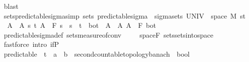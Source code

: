 \begin{isabellebody}
\ blast%
\endisatagproof
{\isafoldproof}%
%
\isadelimproof
%
\endisadelimproof
\isanewline
\isanewline
{}\isamarkupfalse%
\ sets{\isacharunderscore}{\kern0pt}predictable{\isacharunderscore}{\kern0pt}sigma{\isacharbrackleft}{\kern0pt}simp{\isacharbrackright}{\kern0pt}{\isacharcolon}{\kern0pt}\ {\isachardoublequoteopen}sets\ predictable{\isacharunderscore}{\kern0pt}sigma\ {\isacharequal}{\kern0pt}\ sigma{\isacharunderscore}{\kern0pt}sets\ {\isacharparenleft}{\kern0pt}UNIV\ {\isasymtimes}\ space\ M{\isacharparenright}{\kern0pt}\ {\isacharparenleft}{\kern0pt}{\isacharbraceleft}{\kern0pt}{\isacharbraceleft}{\kern0pt}s{\isacharless}{\kern0pt}{\isachardot}{\kern0pt}{\isachardot}{\kern0pt}t{\isacharbraceright}{\kern0pt}\ {\isasymtimes}\ A\ {\isacharbar}{\kern0pt}\ A\ s\ t{\isachardot}{\kern0pt}\ A\ {\isasymin}\ F\ s\ {\isasymand}\ s\ {\isacharless}{\kern0pt}\ t{\isacharbraceright}{\kern0pt}\ {\isasymunion}\ {\isacharbraceleft}{\kern0pt}{\isacharbraceleft}{\kern0pt}bot{\isacharbraceright}{\kern0pt}\ {\isasymtimes}\ A\ {\isacharbar}{\kern0pt}\ A{\isachardot}{\kern0pt}\ A\ {\isasymin}\ F\ bot{\isacharbraceright}{\kern0pt}{\isacharparenright}{\kern0pt}{\isachardoublequoteclose}\ \isanewline
%
\isadelimproof
\ \ %
\endisadelimproof
%
\isatagproof
{}\isamarkupfalse%
\ predictable{\isacharunderscore}{\kern0pt}sigma{\isacharunderscore}{\kern0pt}def\ sets{\isacharunderscore}{\kern0pt}measure{\isacharunderscore}{\kern0pt}of{\isacharunderscore}{\kern0pt}conv\ \isanewline
\ \ \isamarkupfalse%
\ space{\isacharunderscore}{\kern0pt}F\ sets{\isachardot}{\kern0pt}sets{\isacharunderscore}{\kern0pt}into{\isacharunderscore}{\kern0pt}space\isanewline
\ \ \isamarkupfalse%
\ {\isacharparenleft}{\kern0pt}fastforce\ intro{\isacharbang}{\kern0pt}{\isacharcolon}{\kern0pt}\ if{\isacharunderscore}{\kern0pt}P{\isacharparenright}{\kern0pt}%
\endisatagproof
{\isafoldproof}%
%
\isadelimproof
\isanewline
%
\endisadelimproof
\isanewline
{}\isamarkupfalse%
\ predictable\ {\isacharcolon}{\kern0pt}{\isacharcolon}{\kern0pt}\ {\isachardoublequoteopen}{\isacharparenleft}{\kern0pt}{\isacharprime}{\kern0pt}t\ {\isasymRightarrow}\ {\isacharprime}{\kern0pt}a\ {\isasymRightarrow}\ {\isacharprime}{\kern0pt}b\ {\isacharcolon}{\kern0pt}{\isacharcolon}{\kern0pt}\ {\isacharbraceleft}{\kern0pt}second{\isacharunderscore}{\kern0pt}countable{\isacharunderscore}{\kern0pt}topology{\isacharcomma}{\kern0pt}banach{\isacharbraceright}{\kern0pt}{\isacharparenright}{\kern0pt}\ {\isasymRightarrow}\ bool{\isachardoublequoteclose}\ \isanewline

\end{isabellebody}
